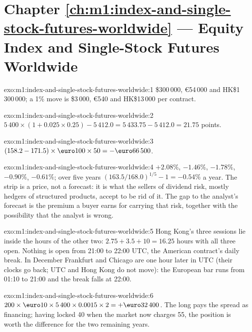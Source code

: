 \section*{Chapter \ref{ch:m1:index-and-single-stock-futures-worldwide} --- Equity Index and Single-Stock Futures Worldwide}

\begin{solution}{exo:m1:index-and-single-stock-futures-worldwide:1}
\$300\,000, \euro54\,000 and HK\$1\,300\,000; a 1\% move is \$3\,000, \euro540 and
HK\$13\,000 per contract.
\end{solution}

\begin{solution}{exo:m1:index-and-single-stock-futures-worldwide:2}
$5\,400 \times (1 + 0.025 \times 0.25) - 5\,412.0 = 5\,433.75 - 5\,412.0 = 21.75$
points.
\end{solution}

\begin{solution}{exo:m1:index-and-single-stock-futures-worldwide:3}
$(158.2 - 171.5) \times \text{\euro}100 \times 50 = -\text{\euro}66\,500$.
\end{solution}

\begin{solution}{exo:m1:index-and-single-stock-futures-worldwide:4}
$+2.08\%$, $-1.46\%$, $-1.78\%$, $-0.90\%$, $-0.61\%$; over five years
$(163.5/168.0)^{1/5} - 1 = -0.54\%$ a year. The strip is a price, not a
forecast: it is what the sellers of dividend risk, mostly hedgers of
structured products, accept to be rid of it. The gap to the analyst's
forecast is the premium a buyer earns for carrying that risk, together with
the possibility that the analyst is wrong.
\end{solution}

\begin{solution}{exo:m1:index-and-single-stock-futures-worldwide:5}
Hong Kong's three sessions lie inside the hours of the other two: $2.75 + 3.5
+ 10 = 16.25$ hours with all three open. Nothing is open from 21:00 to 22:00
UTC, the American contract's daily break. In December Frankfurt and Chicago
are one hour later in UTC (their clocks go back; UTC and Hong Kong do not
move): the European bar runs from 01:10 to 21:00 and the break falls at
22:00.
\end{solution}

\begin{solution}{exo:m1:index-and-single-stock-futures-worldwide:6}
$200 \times \text{\euro}10 \times 5\,400 \times 0.0015 \times 2 =
+\text{\euro}32\,400$. The long pays the spread as financing; having locked 40
when the market now charges 55, the position is worth the difference for
the two remaining years.
\end{solution}

